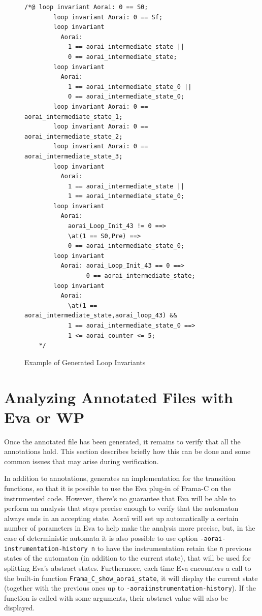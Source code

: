\documentclass{frama-c-book}
\begin{document}
\begin{figure}
\begin{lstlisting}[language=ACSL]
   /*@ loop invariant Aorai: 0 == S0;
        loop invariant Aorai: 0 == Sf;
        loop invariant
          Aorai:
            1 == aorai_intermediate_state ||
            0 == aorai_intermediate_state;
        loop invariant
          Aorai:
            1 == aorai_intermediate_state_0 ||
            0 == aorai_intermediate_state_0;
        loop invariant Aorai: 0 == aorai_intermediate_state_1;
        loop invariant Aorai: 0 == aorai_intermediate_state_2;
        loop invariant Aorai: 0 == aorai_intermediate_state_3;
        loop invariant
          Aorai:
            1 == aorai_intermediate_state ||
            1 == aorai_intermediate_state_0;
        loop invariant
          Aorai:
            aorai_Loop_Init_43 != 0 ==>
            \at(1 == S0,Pre) ==>
            0 == aorai_intermediate_state_0;
        loop invariant
          Aorai: aorai_Loop_Init_43 == 0 ==>
                 0 == aorai_intermediate_state;
        loop invariant
          Aorai:
            \at(1 == aorai_intermediate_state,aorai_loop_43) &&
            1 == aorai_intermediate_state_0 ==>
            1 <= aorai_counter <= 5;
    */
\end{lstlisting}
  \caption{Example of Generated Loop Invariants}
  \label{FigGeneratedLoopInvariants}
\end{figure}

\section{Analyzing Annotated Files with Eva or WP}
\label{collaboration}
Once the annotated file has been generated, it remains to verify that all the
annotations hold. This section describes briefly how this can be done and some
common issues that may arise during verification.

In addition to annotations, \aorai generates an implementation for the transition
functions, so that it is possible to use the Eva plug-in of Frama-C on the
instrumented code. However, there's no guarantee that Eva will be able to
perform an analysis that stays precise enough to verify that the automaton
always ends in an accepting state. Aoraï will set up automatically a certain number
of parameters in Eva to help make the analysis more precise, but,
in the case of deterministic automata it is also possible
to use option \texttt{-aorai-instrumentation-history n} to have the instrumentation
retain the \texttt{n} previous states of the automaton (in addition to the
current state), that will be used for splitting Eva's abstract states. Furthermore,
each time Eva encounters a call to the
built-in function \texttt{Frama\_C\_show\_aorai\_state}, it will display the current
state (together with the previous ones up to \texttt{-aorai\-instrumentation-history}).
If the function is called with some arguments, their abstract value will also be
displayed.
\end{document}
